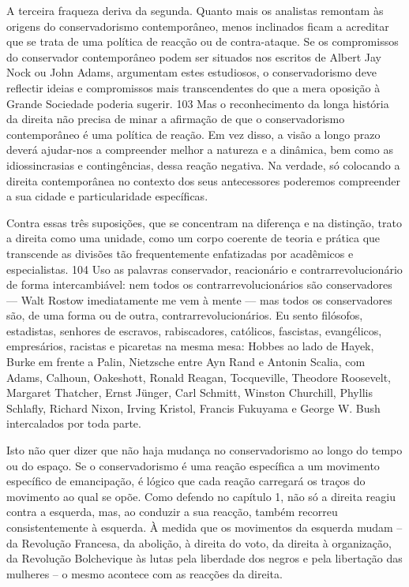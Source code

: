 A terceira fraqueza deriva da segunda. Quanto mais os analistas remontam às origens do conservadorismo contemporâneo, menos inclinados ficam a acreditar que se trata de uma política de reacção ou de contra-ataque. Se os compromissos do conservador contemporâneo podem ser situados nos escritos de Albert Jay Nock ou John Adams, argumentam estes estudiosos, o conservadorismo deve reflectir ideias e compromissos mais transcendentes do que a mera oposição à Grande Sociedade poderia sugerir. {\color{blue}103} Mas o reconhecimento da longa história da direita não precisa de minar a afirmação de que o conservadorismo contemporâneo é uma política de reação. Em vez disso, a visão a longo prazo deverá ajudar-nos a compreender melhor a natureza e a dinâmica, bem como as idiossincrasias e contingências, dessa reação negativa. Na verdade, só colocando a direita contemporânea no contexto dos seus antecessores poderemos compreender a sua cidade e particularidade específicas.
 \par 
Contra essas três suposições, que se concentram na diferença e na distinção, trato a direita como uma unidade, como um corpo coerente de teoria e prática que transcende as divisões tão frequentemente enfatizadas por acadêmicos e especialistas. {\color{blue}104} Uso as palavras conservador, reacionário e contrarrevolucionário de forma intercambiável: nem todos os contrarrevolucionários são conservadores — Walt Rostow imediatamente me vem à mente — mas todos os conservadores são, de uma forma ou de outra, contrarrevolucionários. Eu sento filósofos, estadistas, senhores de escravos, rabiscadores, católicos, fascistas, evangélicos, empresários, racistas e picaretas na mesma mesa: Hobbes ao lado de Hayek, Burke em frente a Palin, Nietzsche entre Ayn Rand e Antonin Scalia, com Adams, Calhoun, Oakeshott, Ronald Reagan, Tocqueville, Theodore Roosevelt, Margaret Thatcher, Ernst Jünger, Carl Schmitt, Winston Churchill, Phyllis Schlafly, Richard Nixon, Irving Kristol, Francis Fukuyama e George W. Bush intercalados por toda parte.
 \par 
Isto não quer dizer que não haja mudança no conservadorismo ao longo do tempo ou do espaço. Se o conservadorismo é uma reação específica a um movimento específico de emancipação, é lógico que cada reação carregará os traços do movimento ao qual se opõe. Como defendo no capítulo 1, não só a direita reagiu contra a esquerda, mas, ao conduzir a sua reacção, também recorreu consistentemente à esquerda. À medida que os movimentos da esquerda mudam – da Revolução Francesa, da abolição, à direita do voto, da direita à organização, da Revolução Bolchevique às lutas pela liberdade dos negros e pela libertação das mulheres – o mesmo acontece com as reacções da direita.
